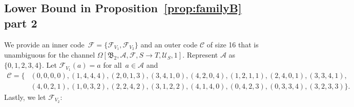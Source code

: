 \documentclass[11pt,a4paper]{article}
\theoremstyle{definition}
\newcommand{\mC}{\mathcal{C}}
\newcommand{\mA}{\mathcal{A}}
\newcommand{\mF}{\mathcal{F}}
\newcommand{\mU}{\mathcal{U}}
\begin{document}
\subsection{Lower Bound in Proposition~\ref{prop:familyB} part 2}

We provide an inner code~$\mF= \{\mF_{V_1},\mF_{V_2}\}$ and an outer code $\mC$ of size 16 that is
unambiguous for the channel $\Omega[\mathfrak{B}_{2},\mA,\mF,S \to T,\mU_S,1]$. Represent $\mA$ as $\{0,1,2,3,4\}$. Let $\mF_{V_1}(a)=a$ for all~$a \in \mA$ and 
\begin{align*}
\mC =\{&(0,0,0,0), (1,4,4,4), (2,0,1,3), (3,4,1,0), (4,2,0,4), (1,2,1,1), (2,4,0,1), (3,3,4,1),\\ & (4,0,2,1), (1,0,3,2), (2,2,4,2), (3,1,2,2), (4,1,4,0), (0,4,2,3), (0,3,3,4), (3,2,3,3)\}.
\end{align*}
Lastly, we let $\mF_{V_2}$:
\end{document}
